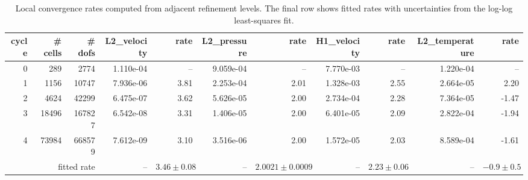 \begin{table}[htbp]
\centering
\begin{tabular}{|r|r|r|r|r|r|r|r|r|r|r|}
\hline
cycle & \# cells & \# dofs & L2\_velocity & rate & L2\_pressure & rate & H1\_velocity & rate & L2\_temperature & rate \\ \hline
0 & 289 & 2774 & 1.110e-04 & -- & 9.059e-04 & -- & 7.770e-03 & -- & 1.220e-04 & -- \\ \hline
1 & 1156 & 10747 & 7.936e-06 & 3.81 & 2.253e-04 & 2.01 & 1.328e-03 & 2.55 & 2.664e-05 & 2.20 \\ \hline
2 & 4624 & 42299 & 6.475e-07 & 3.62 & 5.626e-05 & 2.00 & 2.734e-04 & 2.28 & 7.364e-05 & -1.47 \\ \hline
3 & 18496 & 167827 & 6.542e-08 & 3.31 & 1.406e-05 & 2.00 & 6.401e-05 & 2.09 & 2.822e-04 & -1.94 \\ \hline
4 & 73984 & 668579 & 7.612e-09 & 3.10 & 3.516e-06 & 2.00 & 1.572e-05 & 2.03 & 8.589e-04 & -1.61 \\ \hline
\multicolumn{3}{|r|}{fitted rate} & -- & $3.46 \pm 0.08$ & -- & $2.0021 \pm 0.0009$ & -- & $2.23 \pm 0.06$ & -- & $-0.9 \pm 0.5$ \\ \hline
\end{tabular}
\caption{Local convergence rates computed from adjacent refinement levels. The final row shows fitted rates with uncertainties from the log-log least-squares fit.}
\end{table}
